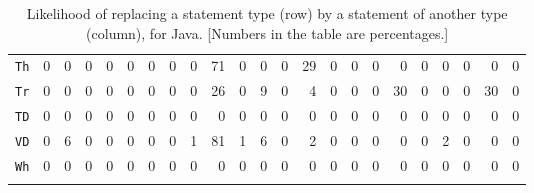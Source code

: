 \begin{table*}
{\begin{tabular}{l|rrrrrrrrrrrrrrrrrrrrrr}
\texttt{Th}	&0&	0&	0&	0&	0&	0&	0&	0&	71&	0&	0&	0&	29&	0&	0&	0&	0&	0&	0&	0&	0&	0\\
\texttt{Tr}	&0&	0&	0&	0&	0&	0&	0&	0&	26&	0&	9&	0&	4&	0&	0&	0&	30&	0&	0&	0&	30&	0\\
\texttt{TD}	&0&	0&	0&	0&	0&	0&	0&	0&	0&	0&	0&	0&	0&	0&	0&	0&	0&	0&	0&	0&	0&	0\\
\texttt{VD}	&0&	6&	0&	0&	0&	0&	0&	1&	81&	1&	6&	0&	2&	0&	0&	0&	0&	0&	2&	0&	0&	0\\
\texttt{Wh}	&0&	0&	0&	0&	0&	0&	0&	0&	0&	0&	0&	0&	0&	0&	0&	0&	0&	0&	0&	0&	0&	0\\
			\\ \bottomrule
		\end{tabular}
		}
\caption{Likelihood of replacing a statement type (row) by a statement of another type (column), for Java. [Numbers in the table are percentages.]}
\label{tab:likelihood}
\end{table*}
